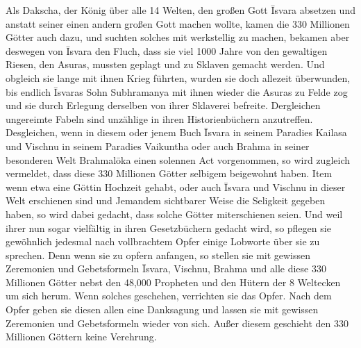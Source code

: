 \documentclass{article}
\begin{document}
Als Dakscha, der König über alle 14 Welten, den großen Gott \={I}svara absetzen und anstatt seiner einen andern großen Gott machen wollte, kamen die 330 Millionen Götter auch dazu, und suchten solches mit werkstellig zu machen, bekamen aber deswegen von \={I}svara den Fluch, dass sie viel 1000 Jahre von den gewaltigen Riesen, den Asuras, mussten geplagt und zu Sklaven gemacht werden. Und obgleich sie lange mit ihnen Krieg führten, wurden sie doch allezeit überwunden, bis endlich \={I}svaras Sohn Subhramanya mit ihnen wieder die Asuras zu Felde zog und sie durch Erlegung derselben von ihrer Sklaverei befreite. Dergleichen ungereimte Fabeln sind unzählige in ihren Historienbüchern anzutreffen. Desgleichen, wenn in diesem oder jenem Buch \={I}svara in seinem Paradies Kailasa und Vischnu in seinem Paradies Vaikuntha oder auch Brahma in seiner besonderen Welt Brahmal\={o}ka einen solennen Act vorgenommen, so wird zugleich vermeldet, dass diese 330 Millionen Götter selbigem beigewohnt haben. Item wenn etwa eine Göttin Hochzeit gehabt, oder auch \={I}svara und Vischnu in dieser Welt erschienen sind und Jemandem sichtbarer Weise die Seligkeit gegeben haben, so wird dabei gedacht, dass solche Götter miterschienen seien. Und weil ihrer nun sogar vielfältig in ihren Gesetzbüchern gedacht wird, so pflegen sie gewöhnlich jedesmal nach vollbrachtem Opfer einige Lobworte über sie zu sprechen. Denn wenn sie zu opfern anfangen, so stellen sie mit gewissen Zeremonien und Gebetsformeln \={I}svara, Vischnu, Brahma und alle diese 330 Millionen Götter nebst den 48,000 Propheten und den Hütern der 8 Weltecken um sich herum. Wenn solches geschehen, verrichten sie das Opfer. Nach dem Opfer geben sie diesen allen eine Danksagung und lassen sie mit gewissen Zeremonien und Gebetsformeln wieder von sich. Außer diesem geschieht den 330 Millionen Göttern keine Verehrung.
\end{document}
